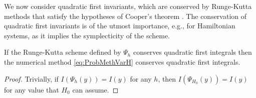 \documentclass{siamart1116}
\numberwithin{theorem}{section}
\begin{document}
We now consider quadratic first invariants, which are conserved by Runge-Kutta methods that satisfy the hypotheses of Cooper's theorem \cite{HLW06}. The conservation of quadratic first invariants is of the utmost importance, e.g., for Hamiltonian systems, as it implies the symplecticity of the scheme. 
\begin{theorem}\label{thm:QuadraticInvariants} If the Runge-Kutta scheme defined by $\Psi_h$ conserves quadratic first integrals then the numerical method \eqref{eq:ProbMethVarH} conserves quadratic first integrals.
\end{theorem}
\begin{proof} Trivially, if $I(\Psi_h(y)) = I(y)$ for any $h$, then $I(\Psi_{H_0}(y)) = I(y)$ for any value that $H_0$ can assume.
\end{proof}
\end{document}
